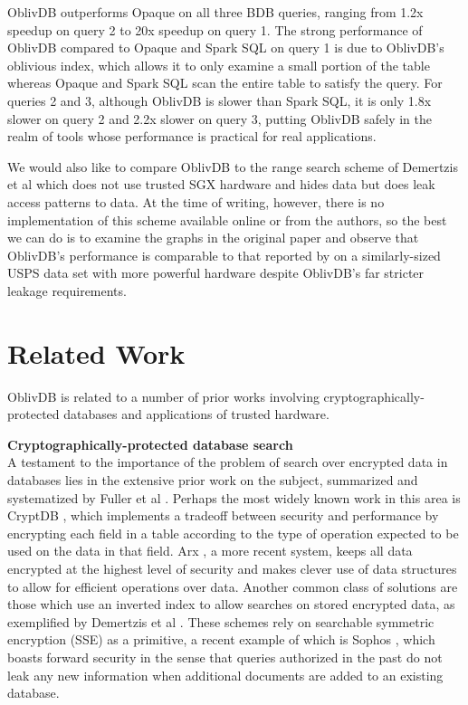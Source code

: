 \documentclass[conference]{IEEEtran}
\def\name/{OblivDB}
\begin{document}
\name/ outperforms Opaque on all three BDB queries, ranging from 1.2x speedup on query 2 to 20x speedup on query 1. The strong performance of \name/ compared to Opaque and Spark SQL on query 1 is due to \name/'s oblivious index, which allows it to only examine a small portion of the table whereas Opaque and Spark SQL scan the entire table to satisfy the query. For queries 2 and 3, although \name/ is slower than Spark SQL, it is only 1.8x slower on query 2 and 2.2x slower on query 3, putting \name/ safely in the realm of tools whose performance is practical for real applications. 

We would also like to compare \name/ to the range search scheme of Demertzis et al \cite{DPP+16} which does not use trusted SGX hardware and hides data but does leak access patterns to data. At the time of writing, however, there is no implementation of this scheme available online or from the authors, so the best we can do is to examine the graphs in the original paper and observe that \name/'s performance is comparable to that reported by \cite{DPP+16} on a similarly-sized USPS data set with more powerful hardware despite \name/'s far stricter leakage requirements. 


\section{Related Work}\label{related}

\name/ is related to a number of prior works involving cryptographically-protected databases and applications of trusted hardware.

\medskip \noindent \textbf{Cryptographically-protected database search}\\
A testament to the importance of the problem of search over encrypted data in databases lies in the extensive prior work on the subject, summarized and systematized by Fuller et al \cite{FVY+17}. Perhaps the most widely known work in this area is CryptDB \cite{PRZB12}, which implements a tradeoff between security and performance by encrypting each field in a table according to the type of operation expected to be used on the data in that field. Arx \cite{PBP16}, a more recent system, keeps all data encrypted at the highest level of security and makes clever use of data structures to allow for efficient operations over data. Another common class of solutions are those which use an inverted index to allow searches on stored encrypted data, as exemplified by Demertzis et al \cite{DPP+16}. These schemes rely on searchable symmetric encryption (SSE) as a primitive, a recent example of which is Sophos \cite{Bost16}, which boasts forward security in the sense that queries authorized in the past do not leak any new information when additional documents are added to an existing database. 
\end{document}
